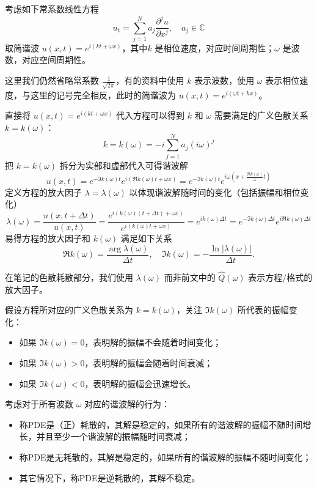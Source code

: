 考虑如下常系数线性方程
\[
    u_t = \sum_{j=1}^N a_j \frac{\partial^j u}{\partial x^j},\quad a_j \in \mathbb{C}
\]
取简谐波 $u(x,t) = e^{i(k t+\omega x)}$，其中$k$ 是相位速度，对应时间周期性；$\omega$ 是波数，对应空间周期性。

\begin{remark}
    这里我们仍然省略常系数 $\frac{1}{\sqrt{2\pi}}$，有的资料中使用 $k$ 表示波数，使用 $\omega$ 表示相位速度，与这里的记号完全相反，此时的简谐波为 $u(x,t) = e^{i(\omega t+k x)}$。
\end{remark}

直接将 $u(x,t) = e^{i(k t+\omega x)}$ 代入方程可以得到 $k$ 和 $\omega$ 需要满足的广义色散关系 $k=k(\omega)$：
\[
    k = k(\omega) =  - i \sum_{j=1}^N a_j (i \omega)^j
\]
把 $k = k(\omega)$ 拆分为实部和虚部代入可得谐波解
\[
    u(x,t) = e^{-\Im k(\omega) t} e^{i(\Re k(\omega) t + \omega x)} = e^{-\Im k(\omega) t} e^{i \omega(x + \frac{\Re k(\omega)}\omega t)}
\]
定义方程的放大因子 $\lambda = \lambda(\omega)$ 以体现谐波解随时间的变化（包括振幅和相位变化）
\[
    \lambda(\omega) = \frac{u(x,t+\Delta t)}{u(x,t)} = \frac{e^{i(k(\omega) (t+\Delta t)+\omega x)}}{e^{i(k(\omega) t+\omega x)}} = e^{i k(\omega) \Delta t}
    = e^{-\Im k(\omega) \Delta t} e^{i \Re k(\omega) \Delta t}
\]
易得方程的放大因子和 $k(\omega)$ 满足如下关系
\[
    \Re k(\omega) = \frac{\arg \lambda(\omega)}{\Delta t},\quad
    \Im k(\omega) = - \frac{\ln |\lambda(\omega)|}{\Delta t}.
\]

\begin{remark}
    在笔记的色散耗散部分，我们使用 $\lambda(\omega)$ 而非前文中的 $\widehat{Q}(\omega)$ 表示方程/格式的放大因子。
\end{remark}

假设方程所对应的广义色散关系为 $k=k(\omega)$，关注 $\Im k(\omega)$ 所代表的振幅变化：
\begin{itemize}
    \item 如果 $\Im k(\omega) = 0$，表明解的振幅不会随着时间变化；
    \item 如果 $\Im k(\omega) > 0$，表明解的振幅会随着时间衰减；
    \item 如果 $\Im k(\omega) < 0$，表明解的振幅会迅速增长。
\end{itemize}

\begin{definition}[方程的耗散性]
    考虑对于所有波数 $\omega$ 对应的谐波解的行为：
    \begin{itemize}
        \item 称PDE是（正）耗散的，其解是稳定的，如果所有的谐波解的振幅不随时间增长，并且至少一个谐波解的振幅随时间衰减；
        \item 称PDE是无耗散的，其解是稳定的，如果所有的谐波解的振幅不随时间变化；
        \item 其它情况下，称PDE是逆耗散的，其解不稳定。
    \end{itemize}
\end{definition}

